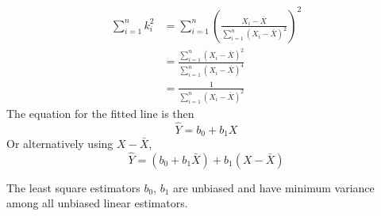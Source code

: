 \begin{align*}
    \sum_{i=1}^n k_i^2 &= \sum_{i=1}^n \left(\frac{X_i-\bar{X}}{\sum_{i=1}^n (X_i - \bar{X})^2}\right)^2\\
    &= \frac{\sum_{i=1}^n (X_i-\bar{X})^2}{\sum_{i=1}^n (X_i-\bar{X})^4}\\
    &= \frac{1}{\sum_{i=1}^n (X_i-\bar{X})^2}
\end{align*}
\noindent
The equation for the fitted line is then 
\[\hat{Y} = b_0 + b_1X\]
Or alternatively using $X - \bar{X}$, 
\[\hat{Y} = (b_0 + b_1\bar{X}) + b_1(X - \bar{X})\]

\begin{theorem}
    The least square estimators $b_0$, $b_1$ are unbiased and have minimum variance among all unbiased linear estimators.  
\end{theorem}

